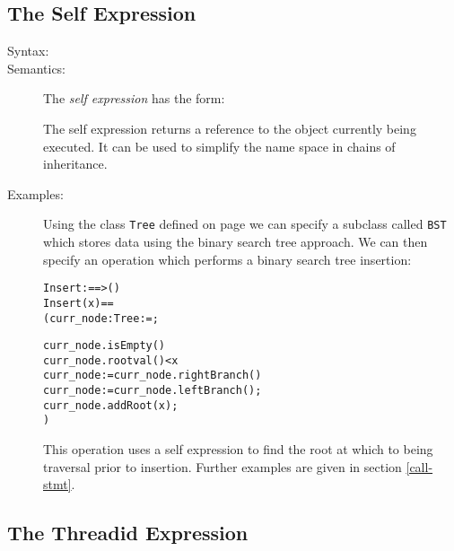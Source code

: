 \documentclass[\pformat,12pt]{article}
\begin{document}
\subsection{The Self Expression}
\label{sec:self}

\begin{description}
\item[Syntax:] 
  
\item[Semantics:] The {\it self expression} has the form:

  \begin{alltt}
  \end{alltt}
  The self expression returns a reference to the object currently
    being executed. It can be used to simplify the name space in
    chains of inheritance.

\item[Examples:] Using the class \texttt{Tree} defined on page
\pageref{TreeDef} we can specify a subclass called \texttt{BST} which
stores data using the binary search tree approach.
We can then specify an operation which performs a binary search tree 
insertion:
\begin{alltt}
    Insert :  ==> ()
    Insert (x) ==
      ( curr_node : Tree := ;

        curr_node.isEmpty() 
          curr_node.rootval() < x
          curr_node := curr_node.rightBranch()
          curr_node := curr_node.leftBranch();
       curr_node.addRoot(x);
       )
\end{alltt}
This operation uses a self expression to find the root at which to
being traversal prior to insertion. Further examples are given in
section \ref{call-stmt}.
\end{description}

\subsection{The Threadid Expression}
\label{sec:threadid}
\end{document}

